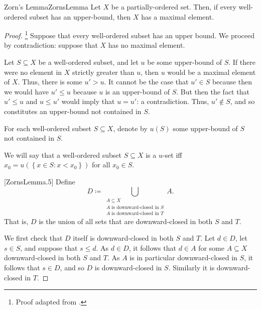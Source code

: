 \begin{thm}{Zorn's Lemma}{ZornsLemma}
Let $X$ be a partially-ordered set.  Then, if every well-ordered subset has an upper-bound, then $X$ has a maximal element.
\begin{proof}\footnote{Proof adapted from \cite{Grayson}.}
Suppose that every well-ordered subset has an upper bound.  We proceed by contradiction:  suppose that $X$ has no maximal element.

Let $S\subseteq X$ be a well-ordered subset, and let $u$ be some upper-bound of $S$.  If there were no element in $X$ strictly greater than $u$, then $u$ would be a maximal element of $X$.  Thus, there is some $u'>u$.  It cannot be the case that $u'\in S$ because then we would have $u'\leq u$ because $u$ is an upper-bound of $S$.  But then the fact that $u'\leq u$ and $u\leq u'$ would imply that $u=u'$:  a contradiction.  Thus, $u'\notin S$, and so constitutes an upper-bound not contained in $S$.

For each well-ordered subset $S\subseteq X$, denote by $u(S)$ some upper-bound of $S$ not contained in $S$.

We will say that a well-ordered subset $S\subseteq X$ is a $u$-set iff $x_0=u\left( \left\{ x\in S:x<x_0\right\} \right)$ for all $x_0\in S$.

[ZornsLemma.5]
Define
\begin{equation}
D\coloneqq \bigcup _{\substack{A\subseteq X \\ A\text{ is downward-closed in }S \\ A\text{ is downward-closed in }T}}A.
\end{equation}
That is, $D$ is the union of all sets that are downward-closed in both $S$ and $T$.

We first check that $D$ itself is downward-closed in both $S$ and $T$.  Let $d\in D$, let $s\in S$, and suppose that $s\leq d$.  As $d\in D$, it follows that $d\in A$ for some $A\subseteq X$ downward-closed in both $S$ and $T$.  As $A$ is in particular downward-closed in $S$, it follows that $s\in D$, and so $D$ is downward-closed in $S$.  Similarly it is downward-closed in $T$.


\end{proof}
\end{thm}
